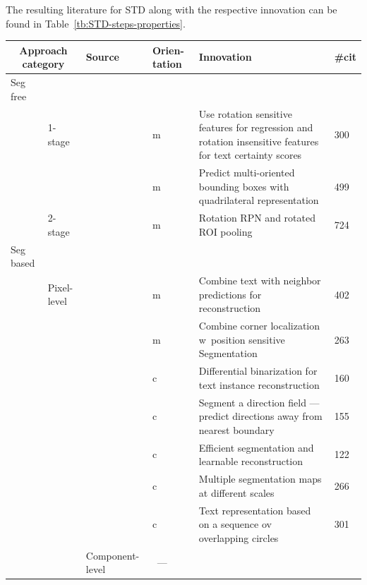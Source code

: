 The resulting literature for \ac{STD} along with the respective innovation can be found in
Table~\ref{tb:STD-steps-properties}.
\begin{table}[h]
    \centering\scriptsize
    \begin{tabular}{p{}p{}p{}p{}
            p{}p{}}
        \multicolumn{2}{c}{\textbf{Approach category}} & \textbf{Source} & \textbf{Orien-tation}
                                                           & \textbf{Innovation} & \textbf{\#cit}\\
        \toprule
        Seg free & & \\
            & 1-stage &~\cite{liao_rotation-sensitive_2018} & m & Use rotation sensitive features
                for regression and rotation insensitive features for text certainty scores & 300 \\
            & &~\cite{liao_textboxes_2018} & m & Predict multi-oriented bounding boxes with
                quadrilateral representation & 499 \\
            & 2-stage &~\cite{ma_arbitrary-oriented_2018} & m & Rotation RPN and rotated \ac{ROI}
                pooling & 724 \\
        \midrule
        Seg based & & \\
            & Pixel-level &~\cite{deng_pixellink_2018} & m & Combine text with neighbor predictions for
               reconstruction & 402 \\
            & &~\cite{lyu_multi-oriented_2018} & m & Combine corner localization w\ position sensitive
               Segmentation & 263\\
            & &~\cite{liao_real-time_2019} & c & Differential binarization for
                text instance reconstruction  & 160\\
            & &~\cite{xu_textfield_2019} & c & Segment a direction field --- predict directions away
               from nearest boundary & 155 \\
            & &~\cite{wang_efficient_2019} & c & Efficient segmentation and learnable reconstruction
               & 122 \\
            & &~\cite{wang_shape_2019} & c & Multiple segmentation maps at different scales & 266 \\
            & &~\cite{ferrari_textsnake_2018} & c & Text representation based on
               a sequence ov overlapping circles & 301 \\
            & & Component-level &~--- & & \\

\end{tabular}
\end{table}
